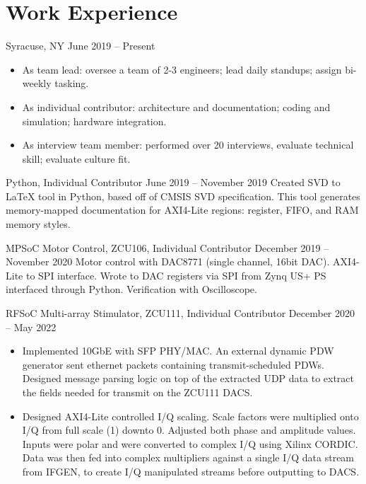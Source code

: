 \documentclass[10pt,final,sans]{resume}
\begin{document}
\section{Work Experience}
 { Syracuse, NY } { June 2019 -- Present }
\begin{itemize}
  \item As team lead: oversee a team of 2-3 engineers; lead daily standups; assign bi-weekly tasking. 
  \item As individual contributor: architecture and documentation; coding and simulation; hardware integration. 
  \item As interview team member: performed over 20 interviews, evaluate technical skill; evaluate culture fit. 
\end{itemize}


\begin{adjustwidth}{.5cm}{}
   {Python, Individual Contributor } { June 2019 -- November 2019 }
  Created SVD to LaTeX tool in Python, based off of CMSIS SVD specification. This tool generates memory-mapped documentation for AXI4-Lite regions: register, FIFO, and RAM memory styles.
\end{adjustwidth}


\begin{adjustwidth}{.5cm}{} 
   { MPSoC Motor Control, ZCU106, Individual Contributor } { December 2019 -- November 2020 }
  Motor control with DAC8771 (single channel, 16bit DAC). AXI4-Lite to SPI interface. Wrote to DAC registers via SPI from Zynq US+ PS interfaced through Python. Verification with Oscilloscope.
\end{adjustwidth}


\begin{adjustwidth}{.5cm}{}
   {RFSoC Multi-array Stimulator, ZCU111, Individual Contributor } { December 2020 -- May 2022 }
  \begin{itemize}
  \item Implemented 10GbE with SFP PHY/MAC. An external dynamic PDW generator sent ethernet packets containing transmit-scheduled PDWs. Designed message parsing logic on top of the extracted UDP data to extract the fields needed for transmit on the ZCU111 DACS.
  
  \item Designed AXI4-Lite controlled I/Q scaling. Scale factors were multiplied onto I/Q from full scale (1) downto 0. Adjusted both phase and amplitude values. Inputs were polar and were converted to complex I/Q using Xilinx CORDIC. Data was then fed into complex multipliers against a single I/Q data stream from IFGEN, to create I/Q manipulated streams before outputting to DACS.
\end{itemize}
\end{adjustwidth}
\end{document}
